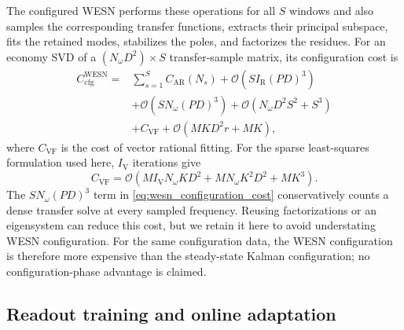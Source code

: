 \documentclass[lettersize,journal]{IEEEtran}
\begin{document}
The configured WESN performs these operations for all $S$ windows and also
samples the corresponding transfer functions, extracts their principal
subspace, fits the retained modes, stabilizes the poles, and factorizes the
residues.  For an economy SVD of a
$(N_{\omega}D^2)\times S$ transfer-sample matrix, its configuration cost is
\begin{equation}
\begin{aligned}
 C_{\mathrm{cfg}}^{\mathrm{WESN}}
 ={}& \sum_{s=1}^{S} C_{\mathrm{AR}}(N_s)
 +\mathcal{O}\!\left(SI_{\mathrm{R}}(PD)^3\right) \\
 &+\mathcal{O}\!\left(SN_{\omega}(PD)^3\right)
 +\mathcal{O}\!\left(N_{\omega}D^2S^2+S^3\right) \\
 &+C_{\mathrm{VF}}
 +\mathcal{O}\!\left(MKD^2r+MK\right),
 \label{eq:wesn_configuration_cost}
\end{aligned}
\end{equation}
where $C_{\mathrm{VF}}$ is the cost of vector rational fitting.  For the sparse
least-squares formulation used here, $I_{\mathrm{V}}$ iterations give
\begin{equation}
 C_{\mathrm{VF}}
 =\mathcal{O}\!\left(
 MI_{\mathrm{V}}N_{\omega}KD^2
 +MN_{\omega}K^2D^2
 +MK^3
 \right).
\end{equation}
The $SN_{\omega}(PD)^3$ term in
\eqref{eq:wesn_configuration_cost} conservatively counts a dense transfer
solve at every sampled frequency.  Reusing factorizations or an eigensystem
can reduce this cost, but we retain it here to avoid understating WESN
configuration.  For the same configuration data, the WESN configuration is
therefore more expensive than the steady-state Kalman configuration; no
configuration-phase advantage is claimed.

\subsection{Readout training and online adaptation}
\end{document}
